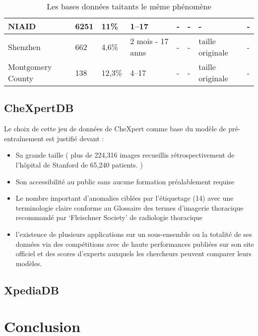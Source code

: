 \begin{table}[H]
\begin{tabularx}{\textwidth}{ |X|X|X|X|X|X|X|X| }
            \hline
            \hfil NIAID & \hfil 6251 & \hfil 11\% & \hfil 1–17 & \hfil - & \hfil - & \hfil - & \hfil - \\
            \hline
            \hfil Shenzhen & \hfil 662 & \hfil 4,6\% & \hfil 2 mois - 17 anns & \hfil - & \hfil - & \hfil taille originale & \hfil - \\
            \hline
            \hfil Montgomery County & \hfil 138 & \hfil 12,3\% &  \hfil 4–17 & \hfil - & \hfil - & \hfil taille originale & \hfil - \\
            \hline
        \end{tabularx}
        \caption{Les bases données taitants le même phénomène}\label{table:all_dbs}
    \end{table}
    \subsection{CheXpertDB}\label{chexpertDB}
    Le choix de cette  jeu de données de CheXpert comme base du modèle de pré-entraînement est justifié devant :
    \begin{itemize}[label=$\bullet$]
        \item Sa grande taille  ( plus de 224,316  images recueillis rétrospectivement de l'hôpital de Stanford de 65,240 patients. ) 
        \item Son accessibilité au public sans aucune formation préalablement requise
        \item Le nombre important d’anomalies ciblées par l'étiquetage (14) avec une terminologie claire conforme au Glossaire des termes d'imagerie thoracique recommandé par ‘Fleischner Society’ de radiologie thoracique 
        \item l’existence de plusieurs applications sur un sous-ensemble ou  la totalité de ses données via des compétitions avec de haute performances publiées sur son site officiel et des scores d'experts auxquels les chercheurs peuvent comparer leurs modèles.
        

    \end{itemize}
    \subsection{XpediaDB}

\section*{Conclusion}